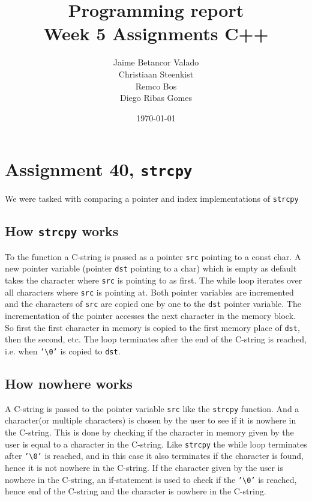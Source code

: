 \documentclass[11pt]{article}
\begin{document}
\title{Programming report \\
       Week 5 Assignments C++
}
\date{\today}
\author{Jaime Betancor Valado \\
Christiaan Steenkist \\
Remco Bos \\
Diego Ribas Gomes
}

\maketitle

\section*{Assignment 40, \texttt{strcpy}}
We were tasked with comparing a pointer and index implementations of \texttt{strcpy}

\subsection*{How \texttt{strcpy} works}
To the function a C-string is passed as a pointer \texttt{src} pointing to a const char.
A new pointer variable (pointer \texttt{dst} pointing to a char) which is empty as default
takes the character where \texttt{src} is pointing to as first. 
The while loop iterates over all characters where \texttt{src} is pointing at.
Both pointer variables are incremented and the characters of \texttt{src} are copied
one by one to the \texttt{dst} pointer variable. The incrementation of the pointer
accesses the next character in the memory block. So first the first character
in memory is copied to the first memory place of \texttt{dst}, then the second, etc.
The loop terminates after the end of the C-string is reached, i.e. when \texttt{'\textbackslash0'}
is copied to \texttt{dst}.

\subsection*{How nowhere works}
A C-string is passed to the pointer variable \texttt{src} like the \texttt{strcpy} function.
And a character(or multiple characters) is chosen by the user to see if it is
nowhere in the C-string.
This is done by checking if the character in memory given by the user is equal
to a character in the C-string. Like \texttt{strcpy} the while loop terminates after \texttt{'\textbackslash0'}
is reached, and in this case it also terminates if the character is found, hence it
is not nowhere in the C-string. If the character given by the user is nowhere in the
C-string, an if-statement is used to check if the \texttt{'\textbackslash0'} is reached, hence end of the
C-string and the character is nowhere in the C-string.
\end{document}
